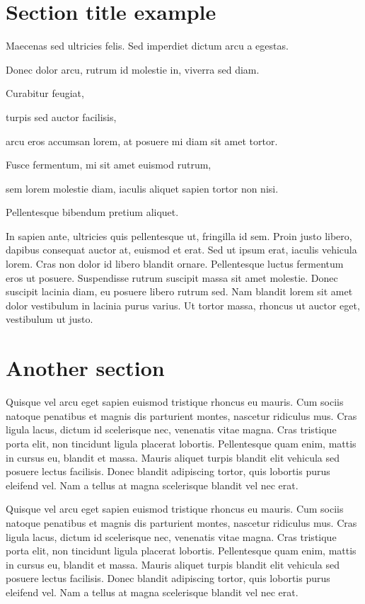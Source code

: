 \documentclass[twoside]{article}
\begin{document}
\begin{multicols}{2}
\section{Section title example}
Maecenas sed ultricies felis. Sed imperdiet dictum arcu a egestas. 
\begin{compactitem}
\item Donec dolor arcu, rutrum id molestie in, viverra sed diam.
\item Curabitur feugiat, 
\item turpis sed auctor facilisis, 
\item arcu eros accumsan lorem, at posuere mi diam sit amet tortor. 
\item Fusce fermentum, mi sit amet euismod rutrum, 
\item sem lorem molestie diam, iaculis aliquet sapien tortor non nisi. \item Pellentesque bibendum pretium aliquet. 
\end{compactitem}
In sapien ante, ultricies quis pellentesque ut, fringilla id sem. Proin justo libero, dapibus consequat auctor at, euismod et erat. Sed ut ipsum erat, iaculis vehicula lorem. Cras non dolor id libero blandit ornare. Pellentesque luctus fermentum eros ut posuere. Suspendisse rutrum suscipit massa sit amet molestie. Donec suscipit lacinia diam, eu posuere libero rutrum sed. Nam blandit lorem sit amet dolor vestibulum in lacinia purus varius. Ut tortor massa, rhoncus ut auctor eget, vestibulum ut justo.

\section{Another section}
Quisque vel arcu eget sapien euismod tristique rhoncus eu mauris. Cum sociis natoque penatibus et magnis dis parturient montes, nascetur ridiculus mus. Cras ligula lacus, dictum id scelerisque nec, venenatis vitae magna. Cras tristique porta elit, non tincidunt ligula placerat lobortis. Pellentesque quam enim, mattis in cursus eu, blandit et massa. Mauris aliquet turpis blandit elit vehicula sed posuere lectus facilisis. Donec blandit adipiscing tortor, quis lobortis purus eleifend vel. Nam a tellus at magna scelerisque blandit vel nec erat.

Quisque vel arcu eget sapien euismod tristique rhoncus eu mauris. Cum sociis natoque penatibus et magnis dis parturient montes, nascetur ridiculus mus. Cras ligula lacus, dictum id scelerisque nec, venenatis vitae magna. Cras tristique porta elit, non tincidunt ligula placerat lobortis. Pellentesque quam enim, mattis in cursus eu, blandit et massa. Mauris aliquet turpis blandit elit vehicula sed posuere lectus facilisis. Donec blandit adipiscing tortor, quis lobortis purus eleifend vel. Nam a tellus at magna scelerisque blandit vel nec erat.


\end{multicols}
\end{document}
